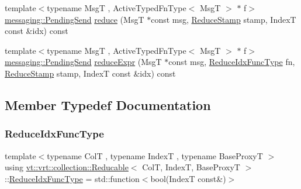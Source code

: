 \begin{DoxyCompactItemize}
\item 
{\footnotesize template$<$typename MsgT , Active\+Typed\+Fn\+Type$<$ Msg\+T $>$ $\ast$ f$>$ }\\\hyperlink{structvt_1_1messaging_1_1_pending_send}{messaging\+::\+Pending\+Send} \hyperlink{structvt_1_1vrt_1_1collection_1_1_reducable_a9a8ad5efbc4314a9658d3bae4f881010}{reduce} (MsgT $\ast$const msg, \hyperlink{structvt_1_1vrt_1_1collection_1_1_reducable_a19f80baf23f36dad4948ef07322fd0cb}{Reduce\+Stamp} stamp, IndexT const \&idx) const
\item 
{\footnotesize template$<$typename MsgT , Active\+Typed\+Fn\+Type$<$ Msg\+T $>$ $\ast$ f$>$ }\\\hyperlink{structvt_1_1messaging_1_1_pending_send}{messaging\+::\+Pending\+Send} \hyperlink{structvt_1_1vrt_1_1collection_1_1_reducable_a8614291c2fa37b9c714581b2b4bb231f}{reduce\+Expr} (MsgT $\ast$const msg, \hyperlink{structvt_1_1vrt_1_1collection_1_1_reducable_a9f5a6c385efafe1fa52937f4809a9486}{Reduce\+Idx\+Func\+Type} fn, \hyperlink{structvt_1_1vrt_1_1collection_1_1_reducable_a19f80baf23f36dad4948ef07322fd0cb}{Reduce\+Stamp} stamp, IndexT const \&idx) const
\end{DoxyCompactItemize}


\subsection{Member Typedef Documentation}
\mbox{\label{structvt_1_1vrt_1_1collection_1_1_reducable_a9f5a6c385efafe1fa52937f4809a9486}} 
\subsubsection{\texorpdfstring{Reduce\+Idx\+Func\+Type}{ReduceIdxFuncType}}
{\footnotesize\ttfamily template$<$typename ColT , typename IndexT , typename Base\+ProxyT $>$ \\
using \hyperlink{structvt_1_1vrt_1_1collection_1_1_reducable}{vt\+::vrt\+::collection\+::\+Reducable}$<$ ColT, IndexT, Base\+ProxyT $>$\+::\hyperlink{structvt_1_1vrt_1_1collection_1_1_reducable_a9f5a6c385efafe1fa52937f4809a9486}{Reduce\+Idx\+Func\+Type} =  std\+::function$<$bool(IndexT const\&)$>$}

